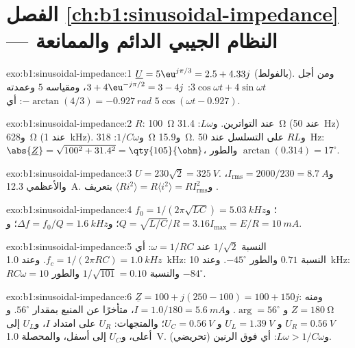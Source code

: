 \section*{الفصل \ref{ch:b1:sinusoidal-impedance} --- النظام الجيبي الدائم والممانعة}

\begin{solution}{exo:b1:sinusoidal-impedance:1}
$\underline U = 5\eu^{j\pi/3} = 2.5 + 4.33j$ (بالفولط). ومن أجل $3\cos\omega t +
4\sin\omega t$: $3 + 4\eu^{-j\pi/2} = 3 - 4j$، ومقياسه $5$ وعمدته
$-\arctan(4/3) = \qty{-0.927}{rad}$: أي $5\cos(\omega t - 0.927)$.
\end{solution}

\begin{solution}{exo:b1:sinusoidal-impedance:2}
$R$: \qty{100}{\ohm} عند التواترين. و$L\omega$: \qty{31.4}{\ohm} (عند \qty{50}{Hz})
و\qty{628}{\ohm} (عند \qty{1}{kHz}). و$1/C\omega$: \qty{318}{\ohm} و\qty{15.9}{\ohm}.
و$RL$ على التسلسل عند \qty{50}{Hz}: $\abs{\underline Z} = \sqrt{100^2 + 31.4^2} =
\qty{105}{\ohm}$، والطور $\arctan(0.314) = 17^\circ$.
\end{solution}

\begin{solution}{exo:b1:sinusoidal-impedance:3}
$U = 230\sqrt2 = \qty{325}{V}$. و$I_{\mathrm{rms}} = 2000/230 = \qty{8.7}{A}$،
والأعظمي \qty{12.3}{A}. و$\langle Ri^2\rangle = R\langle i^2\rangle =
RI_{\mathrm{rms}}^2$ بتعريف .
\end{solution}

\begin{solution}{exo:b1:sinusoidal-impedance:4}
$f_0 = 1/(2\pi\sqrt{LC}) = \qty{5.03}{kHz}$؛ و$Q = \sqrt{L/C}/R = 3.16$؛
و$\Delta f = f_0/Q = \qty{1.6}{kHz}$؛ و$I_{\max} = E/R = \qty{10}{mA}$.
\end{solution}

\begin{solution}{exo:b1:sinusoidal-impedance:5}
النسبة $1/\sqrt2$ عند $\omega = 1/RC$: أي $f_c = 1/(2\pi RC) = \qty{1.0}{kHz}$. وعند
\qty{1.0}{kHz}: النسبة $0.71$ والطور $-45^\circ$. وعند \qty{10}{kHz}:
$RC\omega = 10$ والنسبة $1/\sqrt{101} = 0.10$ والطور $-84^\circ$.
\end{solution}

\begin{solution}{exo:b1:sinusoidal-impedance:6}
$\underline Z = 100 + j(250 - 100) = 100 + 150j$: ومنه $Z = \qty{180}{\ohm}$ و
$\arg = 56^\circ$. و$I = 1.0/180 = \qty{5.6}{mA}$، متأخرًا عن المنبع بمقدار
$56^\circ$. و$U_R = \qty{0.56}{V}$ و $U_L = \qty{1.39}{V}$ و $U_C = \qty{0.56}{V}$؛
والمتجهات: $U_R$ على امتداد $I$، و$U_L$ إلى أعلى، و$U_C$ إلى أسفل، والمحصلة \qty{1.0}{V}.
و$L\omega > 1/C\omega$: أي فوق الرنين (تحريضي).
\end{solution}

